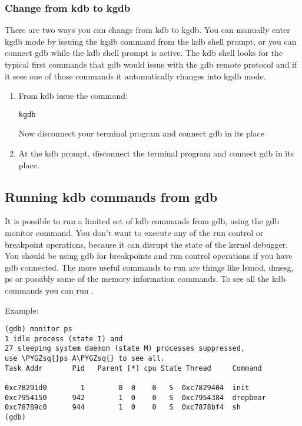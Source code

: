 \documentclass[a4paper,8pt,english]{sphinxmanual}
\def\PYGZsq{\char`\'}
\renewcommand\PYGZsq{\textquotesingle}
\begin{document}
\subsubsection{Change from kdb to kgdb}
\label{dev-tools/kgdb:change-from-kdb-to-kgdb}
There are two ways you can change from kdb to kgdb. You can manually
enter kgdb mode by issuing the kgdb command from the kdb shell prompt,
or you can connect gdb while the kdb shell prompt is active. The kdb
shell looks for the typical first commands that gdb would issue with the
gdb remote protocol and if it sees one of those commands it
automatically changes into kgdb mode.
\begin{enumerate}
\item {} 
From kdb issue the command:

\begin{Verbatim}[commandchars=\\\{\}]
kgdb
\end{Verbatim}

Now disconnect your terminal program and connect gdb in its place

\item {} 
At the kdb prompt, disconnect the terminal program and connect gdb in
its place.

\end{enumerate}


\subsection{Running kdb commands from gdb}
\label{dev-tools/kgdb:running-kdb-commands-from-gdb}
It is possible to run a limited set of kdb commands from gdb, using the
gdb monitor command. You don't want to execute any of the run control or
breakpoint operations, because it can disrupt the state of the kernel
debugger. You should be using gdb for breakpoints and run control
operations if you have gdb connected. The more useful commands to run
are things like lsmod, dmesg, ps or possibly some of the memory
information commands. To see all the kdb commands you can run
.

Example:

\begin{Verbatim}[commandchars=\\\{\}]
(gdb) monitor ps
1 idle process (state I) and
27 sleeping system daemon (state M) processes suppressed,
use \PYGZsq{}ps A\PYGZsq{} to see all.
Task Addr       Pid   Parent [*] cpu State Thread     Command

0xc78291d0        1        0  0    0   S  0xc7829404  init
0xc7954150      942        1  0    0   S  0xc7954384  dropbear
0xc78789c0      944        1  0    0   S  0xc7878bf4  sh
(gdb)
\end{Verbatim}
\end{document}
